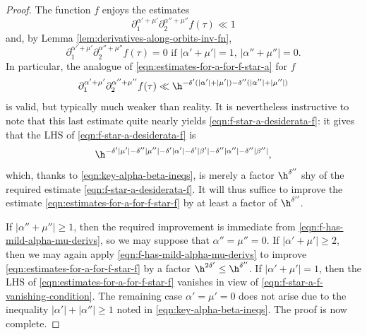 \begin{proof}
  The function $f$ enjoys the estimates
  \begin{equation}\label{eqn:f-has-mild-alpha-mu-derivs}
    \partial_{1}^{\alpha ' + \mu '} \partial_2^{\alpha '' + \mu ''} f(\tau)
    \ll 1
  \end{equation}
  and, by Lemma \ref{lem:derivatives-along-orbits-inv-fn},
  \begin{equation}\label{eqn:f-star-a-f-vanishing-condition}
    \partial_{1}^{\alpha ' + \mu '} \partial_2^{\alpha '' + \mu ''} f(\tau)
    = 0 \text{ if } |\alpha ' + \mu '| = 1, \, |\alpha '' + \mu ''| = 0.
  \end{equation}
  In particular, the analogue of \eqref{eqn:estimates-for-a-for-f-star-a} for $f$
  \begin{equation}\label{eqn:estimates-for-a-for-f-star-f}
    \partial_{1}^{\alpha ' + \mu '} \partial_2^{\alpha '' + \mu ''} f(\tau)
    \ll
    \h^{- \delta '( |\alpha '| +  |\mu '|) - \delta ''(|\alpha ''| + |\mu ''|)}
  \end{equation}
  is valid, but typically much weaker than reality.  It is nevertheless instructive to note that this last estimate quite nearly yields \eqref{eqn:f-star-a-desiderata-f}: it gives that the LHS of \eqref{eqn:f-star-a-desiderata-f} is
  \[
    \h^{- \delta ' |\mu '| - \delta '' | \mu ''| - \delta ' |\alpha '| - \delta ' |\beta '| - \delta '' | \alpha '' | - \delta '' |\beta ''| },
  \]
  which, thanks to \eqref{eqn:key-alpha-beta-ineqs}, is merely a factor $\h^{\delta ''}$ shy of the required estimate \eqref{eqn:f-star-a-desiderata-f}.  It will thus suffice to improve the estimate \eqref{eqn:estimates-for-a-for-f-star-f} by at least a factor of $\h^{\delta ''}$.

  If $|\alpha '' + \mu ''| \geq 1$, then the required improvement is immediate from \eqref{eqn:f-has-mild-alpha-mu-derivs}, so we may suppose that $\alpha '' = \mu '' = 0$.  If $|\alpha ' + \mu '| \geq 2$, then we may again apply \eqref{eqn:f-has-mild-alpha-mu-derivs} to improve \eqref{eqn:estimates-for-a-for-f-star-f} by a factor $\h^{2 \delta '} \leq \h^{\delta ''}$.  If $|\alpha ' + \mu '| = 1$, then the LHS of \eqref{eqn:estimates-for-a-for-f-star-f} vanishes in view of \eqref{eqn:f-star-a-f-vanishing-condition}.  The remaining case $\alpha ' = \mu ' = 0$ does not arise due to the inequality $|\alpha '| + |\alpha ''| \geq 1$ noted in \eqref{eqn:key-alpha-beta-ineqs}.  The proof is now complete.
\end{proof}

